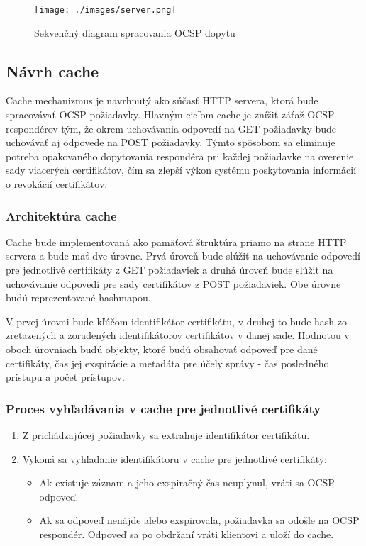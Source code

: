 \documentclass[12pt, twoside]{book}
\begin{document}
\begin{figure}[h]
    \centering
    \texttt{[image: ./images/server.png]}
    \caption{Sekvenčný diagram spracovania OCSP dopytu}
    \label{fig:ocsp_diagram}
\end{figure}


\subsection{Návrh cache}
Cache mechanizmus je navrhnutý ako súčasť HTTP servera, ktorá bude spracovávať OCSP požiadavky. Hlavným cieľom cache je znížiť záťaž OCSP respondérov tým, že okrem uchovávania odpovedí na GET požiadavky bude uchovávať aj odpovede na POST požiadavky. Týmto spôsobom sa eliminuje potreba opakovaného dopytovania respondéra pri každej požiadavke na overenie sady viacerých certifikátov, čím sa zlepší výkon systému poskytovania informácií o revokácií certifikátov.

\subsubsection{Architektúra cache}
Cache bude implementovaná ako pamäťová štruktúra priamo na strane HTTP servera a bude mať dve úrovne. Prvá úroveň bude slúžiť na uchovávanie odpovedí pre jednotlivé certifikáty z GET požiadaviek a druhá úroveň bude slúžiť na uchovávanie odpovedí pre sady certifikátov z POST požiadaviek. Obe úrovne budú reprezentované hashmapou.

V prvej úrovni bude kľúčom identifikátor certifikátu, v druhej to bude hash zo zreťazených a zoradených identifikátorov certifikátov v danej sade. Hodnotou v oboch úrovniach budú objekty, ktoré budú obsahovať odpoveď pre dané certifikáty, čas jej exspirácie a metadáta pre účely správy - čas posledného prístupu a počet prístupov.

\subsubsection{Proces vyhľadávania v cache pre jednotlivé certifikáty}
\begin{enumerate}
\item Z prichádzajúcej požiadavky sa extrahuje identifikátor certifikátu.
\item Vykoná sa vyhľadanie identifikátoru v cache pre jednotlivé certifikáty:
    \begin{itemize}
    \item Ak existuje záznam a jeho exspiračný čas neuplynul, vráti sa OCSP odpoveď.
    \item Ak sa odpoveď nenájde alebo exspirovala, požiadavka sa odošle na OCSP respondér. Odpoveď sa po obdržaní vráti klientovi a uloží do cache.
    \end{itemize}
\end{enumerate}
\end{document}
